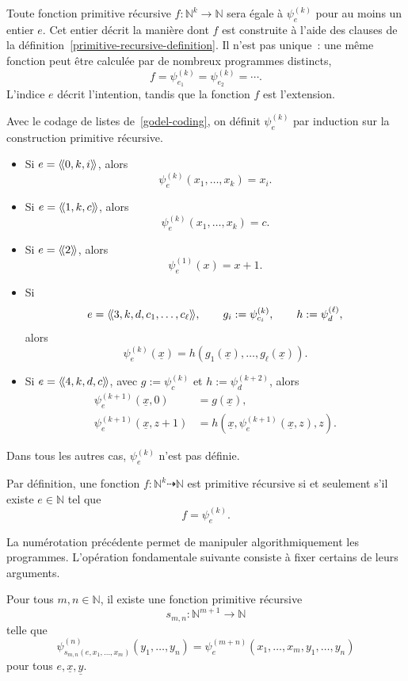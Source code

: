 Toute fonction primitive récursive
$f\colon\mathbb{N}^k\to\mathbb{N}$ sera égale à
$\psi_e^{(k)}$ pour au moins un entier $e$.  Cet entier décrit la
manière dont $f$ est construite à l'aide des clauses de la
définition \ref{primitive-recursive-definition}.  Il n'est pas unique :
une même fonction peut être calculée par de nombreux programmes
distincts,
\[
f=\psi_{e_1}^{(k)}
 =\psi_{e_2}^{(k)}
 =\cdots.
\]
L'indice $e$ décrit l'intention, tandis que la fonction $f$ est
l'extension.

\thingy Avec le codage de listes de \ref{godel-coding}, on définit
$\psi_e^{(k)}$ par induction sur la construction primitive récursive.
\begin{itemize}
\item Si $e=\mathopen{\langle\!\langle}0,k,i\mathclose{\rangle\!\rangle}$, alors
\[
\psi_e^{(k)}(x_1,\ldots,x_k)=x_i.
\]
\item Si $e=\mathopen{\langle\!\langle}1,k,c\mathclose{\rangle\!\rangle}$, alors
\[
\psi_e^{(k)}(x_1,\ldots,x_k)=c.
\]
\item Si $e=\mathopen{\langle\!\langle}2\mathclose{\rangle\!\rangle}$, alors
\[
\psi_e^{(1)}(x)=x+1.
\]
\item Si
\[
e=\mathopen{\langle\!\langle}3,k,d,c_1,\ldots,c_\ell\mathclose{\rangle\!\rangle},
\qquad
g_i:=\psi_{c_i}^{(k)},\qquad h:=\psi_d^{(\ell)},
\]
alors
\[
\psi_e^{(k)}(\underline{x})
 =h(g_1(\underline{x}),\ldots,g_\ell(\underline{x})).
\]
\item Si $e=\mathopen{\langle\!\langle}4,k,d,c\mathclose{\rangle\!\rangle}$, avec
$g:=\psi_c^{(k)}$ et $h:=\psi_d^{(k+2)}$, alors
\[
\begin{aligned}
\psi_e^{(k+1)}(\underline{x},0)
 &=g(\underline{x}),\\
\psi_e^{(k+1)}(\underline{x},z+1)
 &=h(\underline{x},
     \psi_e^{(k+1)}(\underline{x},z),z).
\end{aligned}
\]
\end{itemize}
Dans tous les autres cas, $\psi_e^{(k)}$ n'est pas définie.

Par définition, une fonction
$f\colon\mathbb{N}^k\dasharrow\mathbb{N}$ est primitive récursive si
et seulement s'il existe $e\in\mathbb{N}$ tel que
\[
f=\psi_e^{(k)}.
\]

\thingy La numérotation précédente permet de manipuler
algorithmiquement les programmes.  L'opération fondamentale suivante
consiste à fixer certains de leurs arguments.

\begin{thm}
\label{smn-primitive-recursive}
Pour tous $m,n\in\mathbb{N}$, il existe une fonction primitive
récursive
\[
s_{m,n}\colon\mathbb{N}^{m+1}\to\mathbb{N}
\]
telle que
\[
\psi^{(n)}_{s_{m,n}(e,x_1,\ldots,x_m)}
       (y_1,\ldots,y_n)
 =
\psi^{(m+n)}_e
       (x_1,\ldots,x_m,y_1,\ldots,y_n)
\]
pour tous $e,\underline{x},\underline{y}$.
\end{thm}

